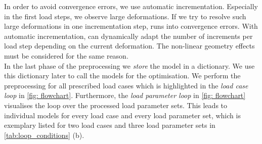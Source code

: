 In order to avoid convergence errors, we use automatic incrementation.
Especially in the first load steps, we observe large deformations.
If we try to resolve such large deformations in one incrementation step,  runs into convergence errors.
With automatic incrementation,  can dynamically adapt the number of increments per load step depending on the current deformation. The non-linear geometry effects must be considered for the same reason. \\
\indent In the last phase of the preprocessing we \emph{store} the model in a dictionary. We use this dictionary later to call the models for the optimisation.
We perform the preprocessing for all prescribed load cases which is highlighted in the \emph{load case loop} in \autoref{fig: flowchart}. Furthermore, the \emph{load parameter loop} in \autoref{fig: flowchart} visualises the loop over the processed load parameter sets. This leads to individual models for every load case and every load parameter set, which is exemplary listed for two load cases and three load parameter sets in \autoref{tab:loop_conditions} (b).

